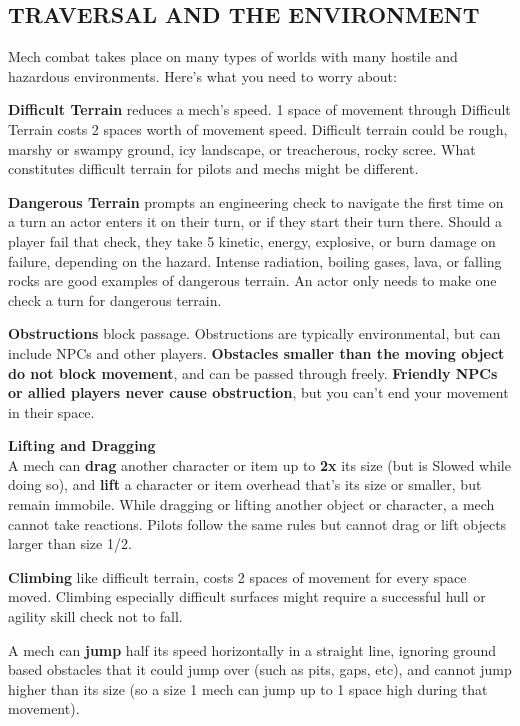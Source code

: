 \subsection{TRAVERSAL AND THE ENVIRONMENT}

Mech combat takes place on many types of worlds with many hostile and hazardous environments. Here’s what you need to worry about:


\textbf{Difficult Terrain} reduces a mech’s speed. 1 space of movement through Difficult Terrain costs 2 spaces worth of movement speed. Difficult terrain could be rough, marshy or swampy ground, icy landscape, or treacherous, rocky scree. What constitutes difficult terrain for pilots and mechs might be different.

\textbf{Dangerous Terrain} prompts an engineering check to navigate the first time on a turn an actor enters it on their turn, or if they start their turn there. Should a player fail that check, they take 5 kinetic, energy, explosive, or burn damage on failure, depending on the hazard. Intense radiation, boiling gases, lava, or falling rocks are good examples of dangerous terrain. An actor only needs to make one check a turn for dangerous terrain.

\textbf{Obstructions} block passage. Obstructions are typically environmental, but can include NPCs and other players. \textbf{Obstacles smaller than the moving object do not block movement}, and can be passed through freely. \textbf{Friendly NPCs or allied players never cause obstruction}, but you can’t end your movement in their space.


\textbf{Lifting and Dragging}\\
A mech can \textbf{drag} another character or item up to \textbf{2x} its size (but is Slowed while doing so), and \textbf{lift} a character or item overhead that’s its size or smaller, but remain immobile. While dragging or lifting another object or character, a mech cannot take reactions. Pilots follow the same rules but cannot drag or lift objects larger than size 1/2.

\textbf{Climbing} like difficult terrain, costs 2 spaces of movement for every space moved. Climbing especially difficult surfaces might require a successful hull or agility skill check not to fall.


A mech can \textbf{jump} half its speed horizontally in a straight line, ignoring ground based obstacles that it could jump over (such as pits, gaps, etc), and cannot jump higher than its size (so a size 1 mech can jump up to 1 space high during that movement).

